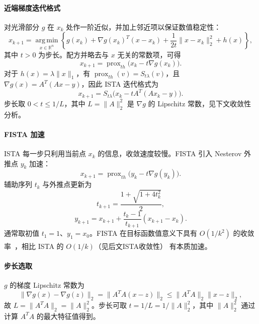 \documentclass[UTF8]{ctexart}
\numberwithin{figure}{section}
\newcommand{\scite}[1]{\textsuperscript{\cite{#1}}}
\theoremstyle{definition}
\theoremstyle{examplestyle}
\theoremstyle{remark}
\begin{document}
\paragraph*{近端梯度迭代格式}
对光滑部分 $g$ 在 $x_k$ 处作一阶近似，并加上邻近项以保证数值稳定性：
\begin{equation}
\label{eq:ista-update}
x_{k+1}=\operatorname*{arg\,min}_{x\in\mathbb{R}^n}\left\{g(x_k)+\nabla g(x_k)^T(x-x_k)+\frac{1}{2t}\|x-x_k\|_2^2+h(x)\right\},
\end{equation}
其中 $t>0$ 为步长。配方并略去与 $x$ 无关的常数项，可得
\[
x_{k+1}=\operatorname{prox}_{th}\bigl(x_k-t\nabla g(x_k)\bigr).
\]
对于 $h(x)=\lambda\|x\|_1$，有 $\operatorname{prox}_{th}(v)=S_{t\lambda}(v)$，且 $\nabla g(x)=A^T(Ax-y)$，因此 ISTA 迭代格式为
\begin{equation}
\label{eq:ista}
x_{k+1}=S_{t\lambda}\bigl(x_k-tA^T(Ax_k-y)\bigr).
\end{equation}
步长取 $0<t\le1/L$，其中 $L=\|A\|_2^2$ 是 $\nabla g$ 的 Lipschitz 常数，见下文收敛性分析。

\paragraph*{FISTA 加速}
ISTA 每一步只利用当前点 $x_k$ 的信息，收敛速度较慢。FISTA 引入 Nesterov 外推点 $y_k$ 加速：
\begin{equation}
\label{eq:fista-y}
x_{k+1}=\operatorname{prox}_{th}\bigl(y_k-t\nabla g(y_k)\bigr).
\end{equation}
辅助序列 $t_k$ 与外推点更新为
\begin{equation}
\label{eq:fista-t}
t_{k+1}=\frac{1+\sqrt{1+4t_k^2}}{2},
\end{equation}
\begin{equation}
\label{eq:fista-extrap}
y_{k+1}=x_{k+1}+\frac{t_k-1}{t_{k+1}}(x_{k+1}-x_k).
\end{equation}
通常取初值 $t_1=1$、$y_1=x_0$。FISTA 在目标函数值意义下具有 $O(1/k^2)$ 的收敛率~\scite{beck2009}，相比 ISTA 的 $O(1/k)$（见后文ISTA收敛性） 有本质加速。

\paragraph*{步长选取}
$g$ 的梯度 Lipschitz 常数为
\[
\|\nabla g(x)-\nabla g(z)\|_2=\|A^TA(x-z)\|_2\le\|A^TA\|_2\|x-z\|_2,
\]
故 $L=\|A^TA\|_2=\|A\|_2^2$。步长可取 $t=1/L=1/\|A\|_2^2$，其中 $\|A\|_2^2$ 通过计算 $A^TA$ 的最大特征值得到。
\end{document}
